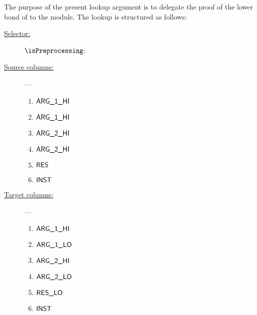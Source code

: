 The purpose of the present lookup argument is to delegate the proof of the lower bond of \blockHashArgument{} to the \wcpMod{} module.
The lookup is structured as follows:
\begin{description}
	\item[\underline{Selector:}] $\isPreprocessing$:
	\item[\underline{Source columns:}] ---
		\begin{multicols}{3}
			\begin{enumerate}
				\item $\textsf{ARG}\textsf{\_1}\textsf{\_HI}$
				\item $\textsf{ARG}\textsf{\_1}\textsf{\_HI}$
				\item $\textsf{ARG}\textsf{\_2}\textsf{\_HI}$
				\item $\textsf{ARG}\textsf{\_2}\textsf{\_HI}$
				\item $\textsf{RES}$
				\item $\textsf{INST}$
			\end{enumerate}
		\end{multicols}
	\item[\underline{Target columns:}] ---
		\begin{multicols}{3}
		\begin{enumerate}
			\item $\textsf{ARG}\textsf{\_1}\textsf{\_HI}$
			\item $\textsf{ARG}\textsf{\_1}\textsf{\_LO}$
			\item $\textsf{ARG}\textsf{\_2}\textsf{\_HI}$
			\item $\textsf{ARG}\textsf{\_2}\textsf{\_LO}$
			\item $\textsf{RES}\textsf{\_LO}$
			\item $\textsf{INST}$
		\end{enumerate}
		\end{multicols}
\end{description}
